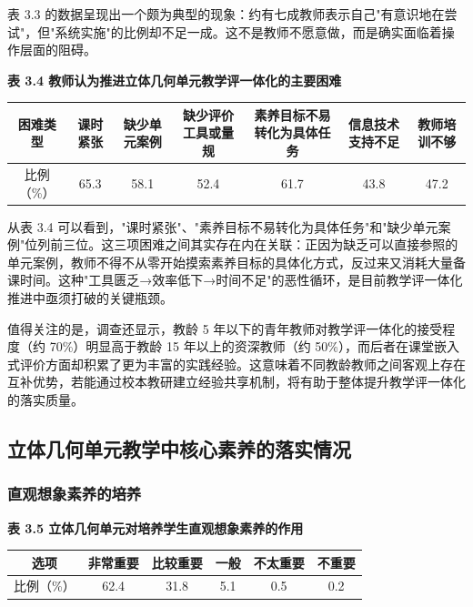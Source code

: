 \documentclass[UTF8,a4paper,12pt,twoside]{ctexart}
\begin{document}
表 3.3 的数据呈现出一个颇为典型的现象：约有七成教师表示自己"有意识地在尝试"，但"系统实施"的比例却不足一成。这不是教师不愿意做，而是确实面临着操作层面的阻碍。

\textbf{表 3.4 教师认为推进立体几何单元教学评一体化的主要困难}

\begin{center}
\begin{tabular}{|c|c|c|c|c|c|c|}
\hline
困难类型 & 课时紧张 & 缺少单元案例 & 缺少评价工具或量规 & 素养目标不易转化为具体任务 & 信息技术支持不足 & 教师培训不够 \\
\hline
比例（\%） & 65.3 & 58.1 & 52.4 & 61.7 & 43.8 & 47.2 \\
\hline
\end{tabular}
\end{center}

从表 3.4 可以看到，"课时紧张"、"素养目标不易转化为具体任务"和"缺少单元案例"位列前三位。这三项困难之间其实存在内在关联：正因为缺乏可以直接参照的单元案例，教师不得不从零开始摸索素养目标的具体化方式，反过来又消耗大量备课时间。这种"工具匮乏→效率低下→时间不足"的恶性循环，是目前教学评一体化推进中亟须打破的关键瓶颈。

值得关注的是，调查还显示，教龄 5 年以下的青年教师对教学评一体化的接受程度（约 70\%）明显高于教龄 15 年以上的资深教师（约 50\%），而后者在课堂嵌入式评价方面却积累了更为丰富的实践经验。这意味着不同教龄教师之间客观上存在互补优势，若能通过校本教研建立经验共享机制，将有助于整体提升教学评一体化的落实质量。

\subsection{立体几何单元教学中核心素养的落实情况}

\subsubsection{直观想象素养的培养}

\textbf{表 3.5 立体几何单元对培养学生直观想象素养的作用}

\begin{center}
\begin{tabular}{|c|c|c|c|c|c|}
\hline
选项 & 非常重要 & 比较重要 & 一般 & 不太重要 & 不重要 \\
\hline
比例（\%） & 62.4 & 31.8 & 5.1 & 0.5 & 0.2 \\
\hline
\end{tabular}
\end{center}
\end{document}
